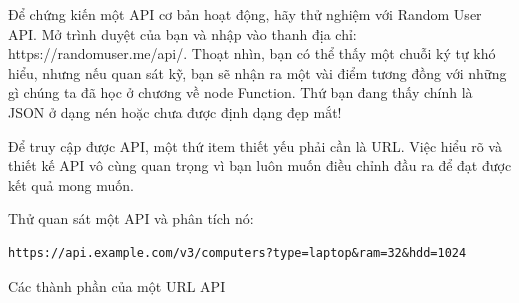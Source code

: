 Để chứng kiến một API cơ bản hoạt động, hãy thử nghiệm với Random User API. Mở trình duyệt của bạn và nhập vào thanh địa chỉ: https://randomuser.me/api/. Thoạt nhìn, bạn có thể thấy một chuỗi ký tự khó hiểu, nhưng nếu quan sát kỹ, bạn sẽ nhận ra một vài điểm tương đồng với những gì chúng ta đã học ở chương về node Function. Thứ bạn đang thấy chính là JSON ở dạng nén hoặc chưa được định dạng đẹp mắt!

Để truy cập được API, một thứ item thiết yếu phải cần là URL. Việc hiểu rõ và thiết kế API vô cùng quan trọng vì bạn luôn muốn điều chỉnh đầu ra để đạt được kết quả mong muốn. 


Thử quan sát một API và phân tích nó:

\begin{verbatim}
https://api.example.com/v3/computers?type=laptop&ram=32&hdd=1024
\end{verbatim}

Các thành phần của một URL API

